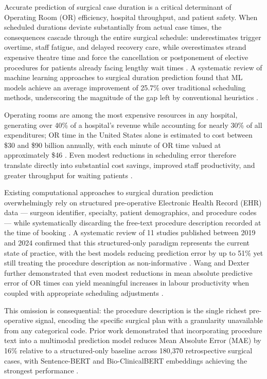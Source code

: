
Accurate prediction of surgical case duration is a critical determinant of Operating Room (OR) efficiency, hospital throughput, and patient safety. When scheduled durations deviate substantially from actual case times, the consequences cascade through the entire surgical schedule: underestimates trigger overtime, staff fatigue, and delayed recovery care, while overestimates strand expensive theatre time and force the cancellation or postponement of elective procedures for patients already facing lengthy wait times \cite{oliveira2023systematic,park2025machine}. A systematic review of machine learning approaches to surgical duration prediction found that ML models achieve an average improvement of 25.7\% over traditional scheduling methods, underscoring the magnitude of the gap left by conventional heuristics \cite{park2025machine}.

Operating rooms are among the most expensive resources in any hospital, generating over 40\% of a hospital's revenue while accounting for nearly 30\% of all expenditures; OR time in the United States alone is estimated to cost between \$30 and \$90 billion annually, with each minute of OR time valued at approximately \$46 \cite{al2025comprehensive,park2025machine}. Even modest reductions in scheduling error therefore translate directly into substantial cost savings, improved staff productivity, and greater throughput for waiting patients \cite{wang2022more}.

Existing computational approaches to surgical duration prediction overwhelmingly rely on structured pre-operative Electronic Health Record (EHR) data — surgeon identifier, specialty, patient demographics, and procedure codes — while systematically discarding the free-text procedure description recorded at the time of booking \cite{kwong2025optimizing,park2025machine}. A systematic review of 11 studies published between 2019 and 2024 confirmed that this structured-only paradigm represents the current state of practice, with the best models reducing prediction error by up to 51\% yet still treating the procedure description as non-informative \cite{park2025machine}. Wang and Dexter further demonstrated that even modest reductions in mean absolute predictive error of OR times can yield meaningful increases in labour productivity when coupled with appropriate scheduling adjustments \cite{wang2022more}.

This omission is consequential: the procedure description is the single richest pre-operative signal, encoding the specific surgical plan with a granularity unavailable from any categorical code. Prior work demonstrated that incorporating procedure text into a multimodal prediction model reduces Mean Absolute Error (MAE) by 16\% relative to a structured-only baseline across 180{,}370 retrospective surgical cases, with Sentence-BERT and Bio-ClinicalBERT embeddings achieving the strongest performance \cite{noorchenarboo2026benchmarking}.

